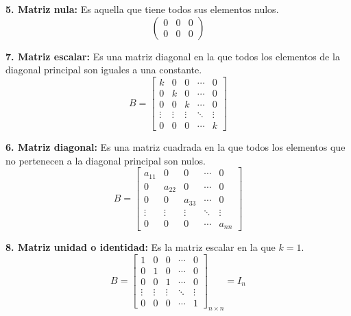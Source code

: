 \documentclass[11pt,a4paper]{article}
\begin{document}
\begin{minipage}[t]{0.485\textwidth}
\textbf{5. Matriz nula:} Es aquella que tiene todos sus elementos nulos.
\[\begin{pmatrix} 0 & 0 & 0\\ 0 & 0 & 0\end{pmatrix}\]

\textbf{7. Matriz escalar:} Es una matriz diagonal en la que todos los elementos de la
diagonal principal son iguales a una constante.
\[
B = \begin{bmatrix}
k & 0 & 0 & \cdots & 0\\
0 & k & 0 & \cdots & 0\\
0 & 0 & k & \cdots & 0\\
\vdots & \vdots & \vdots & \ddots & \vdots\\
0 & 0 & 0 & \cdots & k
\end{bmatrix}
\]
\end{minipage}\hfill
\begin{minipage}[t]{0.485\textwidth}
\textbf{6. Matriz diagonal:} Es una matriz cuadrada en la que todos los elementos que no
pertenecen a la diagonal principal son nulos.
\[
B = \begin{bmatrix}
a_{11} & 0 & 0 & \cdots & 0\\
0 & a_{22} & 0 & \cdots & 0\\
0 & 0 & a_{33} & \cdots & 0\\
\vdots & \vdots & \vdots & \ddots & \vdots\\
0 & 0 & 0 & \cdots & a_{nn}
\end{bmatrix}
\]

\textbf{8. Matriz unidad o identidad:} Es la matriz escalar en la que $k = 1$.
\[
B = \begin{bmatrix}
1 & 0 & 0 & \cdots & 0\\
0 & 1 & 0 & \cdots & 0\\
0 & 0 & 1 & \cdots & 0\\
\vdots & \vdots & \vdots & \ddots & \vdots\\
0 & 0 & 0 & \cdots & 1
\end{bmatrix}_{n\times n} = I_n
\]
\end{minipage}
\end{document}
